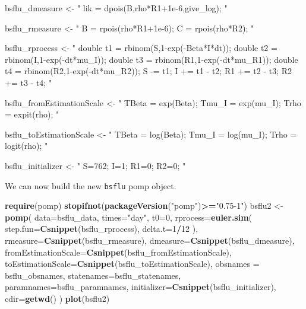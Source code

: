 \documentclass[]{article}
\newenvironment{Shaded}{\begin{snugshade}}{\end{snugshade}}
\newcommand{\KeywordTok}[1]{\textcolor[rgb]{0.13,0.29,0.53}{\textbf{#1}}}
\newcommand{\DataTypeTok}[1]{\textcolor[rgb]{0.13,0.29,0.53}{#1}}
\newcommand{\DecValTok}[1]{\textcolor[rgb]{0.00,0.00,0.81}{#1}}
\newcommand{\StringTok}[1]{\textcolor[rgb]{0.31,0.60,0.02}{#1}}
\newcommand{\OperatorTok}[1]{\textcolor[rgb]{0.81,0.36,0.00}{\textbf{#1}}}
\newcommand{\NormalTok}[1]{#1}
\begin{document}
\begin{Shaded}
\begin{Highlighting}[]
\NormalTok{bsflu_dmeasure <-}\StringTok{ "}
\StringTok{  lik = dpois(B,rho*R1+1e-6,give_log);}
\StringTok{"}

\NormalTok{bsflu_rmeasure <-}\StringTok{ "}
\StringTok{  B = rpois(rho*R1+1e-6);}
\StringTok{  C = rpois(rho*R2);}
\StringTok{"}

\NormalTok{bsflu_rprocess <-}\StringTok{ "}
\StringTok{  double t1 = rbinom(S,1-exp(-Beta*I*dt));}
\StringTok{  double t2 = rbinom(I,1-exp(-dt*mu_I));}
\StringTok{  double t3 = rbinom(R1,1-exp(-dt*mu_R1));}
\StringTok{  double t4 = rbinom(R2,1-exp(-dt*mu_R2));}
\StringTok{  S -= t1;}
\StringTok{  I += t1 - t2;}
\StringTok{  R1 += t2 - t3;}
\StringTok{  R2 += t3 - t4;}
\StringTok{"}

\NormalTok{bsflu_fromEstimationScale <-}\StringTok{ "}
\StringTok{ TBeta = exp(Beta);}
\StringTok{ Tmu_I = exp(mu_I);}
\StringTok{ Trho = expit(rho);}
\StringTok{"}

\NormalTok{bsflu_toEstimationScale <-}\StringTok{ "}
\StringTok{ TBeta = log(Beta);}
\StringTok{ Tmu_I = log(mu_I);}
\StringTok{ Trho = logit(rho);}
\StringTok{"}

\NormalTok{bsflu_initializer <-}\StringTok{ "}
\StringTok{ S=762;}
\StringTok{ I=1;}
\StringTok{ R1=0;}
\StringTok{ R2=0;}
\StringTok{"}
\end{Highlighting}
\end{Shaded}

We can now build the new \texttt{bsflu} pomp object.

\begin{Shaded}
\begin{Highlighting}[]
\KeywordTok{require}\NormalTok{(pomp)}
\KeywordTok{stopifnot}\NormalTok{(}\KeywordTok{packageVersion}\NormalTok{(}\StringTok{"pomp"}\NormalTok{)}\OperatorTok{>=}\StringTok{"0.75-1"}\NormalTok{)}
\NormalTok{bsflu2 <-}\StringTok{ }\KeywordTok{pomp}\NormalTok{(}
  \DataTypeTok{data=}\NormalTok{bsflu_data,}
  \DataTypeTok{times=}\StringTok{"day"}\NormalTok{,}
  \DataTypeTok{t0=}\DecValTok{0}\NormalTok{,}
  \DataTypeTok{rprocess=}\KeywordTok{euler.sim}\NormalTok{(}
    \DataTypeTok{step.fun=}\KeywordTok{Csnippet}\NormalTok{(bsflu_rprocess),}
    \DataTypeTok{delta.t=}\DecValTok{1}\OperatorTok{/}\DecValTok{12}
\NormalTok{  ),}
  \DataTypeTok{rmeasure=}\KeywordTok{Csnippet}\NormalTok{(bsflu_rmeasure),}
  \DataTypeTok{dmeasure=}\KeywordTok{Csnippet}\NormalTok{(bsflu_dmeasure),}
  \DataTypeTok{fromEstimationScale=}\KeywordTok{Csnippet}\NormalTok{(bsflu_fromEstimationScale),}
  \DataTypeTok{toEstimationScale=}\KeywordTok{Csnippet}\NormalTok{(bsflu_toEstimationScale),}
  \DataTypeTok{obsnames =}\NormalTok{ bsflu_obsnames,}
  \DataTypeTok{statenames=}\NormalTok{bsflu_statenames,}
  \DataTypeTok{paramnames=}\NormalTok{bsflu_paramnames,}
  \DataTypeTok{initializer=}\KeywordTok{Csnippet}\NormalTok{(bsflu_initializer),}
  \DataTypeTok{cdir=}\KeywordTok{getwd}\NormalTok{()}
\NormalTok{)}
\KeywordTok{plot}\NormalTok{(bsflu2)}
\end{Highlighting}
\end{Shaded}
\end{document}
